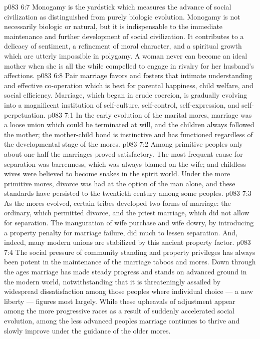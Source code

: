 \vs p083 6:7 Monogamy is the yardstick which measures the advance of social civilization as distinguished from purely biologic evolution. Monogamy is not necessarily biologic or natural, but it is indispensable to the immediate maintenance and further development of social civilization. It contributes to a delicacy of sentiment, a refinement of moral character, and a spiritual growth which are utterly impossible in polygamy. A woman never can become an ideal mother when she is all the while compelled to engage in rivalry for her husband’s affections.
\vs p083 6:8 Pair marriage favors and fosters that intimate understanding and effective co\hyp{}operation which is best for parental happiness, child welfare, and social efficiency. Marriage, which began in crude coercion, is gradually evolving into a magnificent institution of self\hyp{}culture, self\hyp{}control, self\hyp{}expression, and self\hyp{}perpetuation.
\vs p083 7:1 In the early evolution of the marital mores, marriage was a loose union which could be terminated at will, and the children always followed the mother; the mother\hyp{}child bond is instinctive and has functioned regardless of the developmental stage of the mores.
\vs p083 7:2 Among primitive peoples only about one half the marriages proved satisfactory. The most frequent cause for separation was barrenness, which was always blamed on the wife; and childless wives were believed to become snakes in the spirit world. Under the more primitive mores, divorce was had at the option of the man alone, and these standards have persisted to the twentieth century among some peoples.
\vs p083 7:3 As the mores evolved, certain tribes developed two forms of marriage: the ordinary, which permitted divorce, and the priest marriage, which did not allow for separation. The inauguration of wife purchase and wife dowry, by introducing a property penalty for marriage failure, did much to lessen separation. And, indeed, many modern unions are stabilized by this ancient property factor.
\vs p083 7:4 The social pressure of community standing and property privileges has always been potent in the maintenance of the marriage taboos and mores. Down through the ages marriage has made steady progress and stands on advanced ground in the modern world, notwithstanding that it is threateningly assailed by widespread dissatisfaction among those peoples where individual choice --- a new liberty --- figures most largely. While these upheavals of adjustment appear among the more progressive races as a result of suddenly accelerated social evolution, among the less advanced peoples marriage continues to thrive and slowly improve under the guidance of the older mores.

